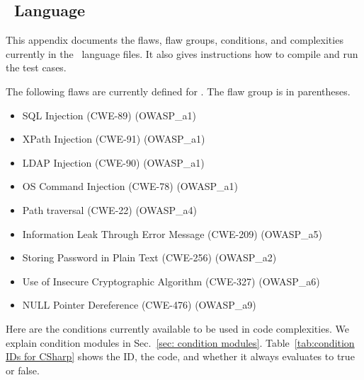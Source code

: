 \clearpage

\begin{appendices}

\section{\CSharp\ Language}
\label{sec:CSharp language}

This appendix documents the flaws, flaw groups, conditions, and complexities
currently in the
\CSharp\ language files.
It also gives instructions how to compile and run the test cases.

The following flaws are currently defined for \CSharp.
The flaw group is in parentheses.
\begin{itemize}[nosep]
    \item SQL Injection (CWE-89)
        (OWASP\_a1)
    \item XPath Injection (CWE-91)
        (OWASP\_a1)
    \item LDAP Injection (CWE-90)
        (OWASP\_a1)
    \item OS Command Injection (CWE-78)
        (OWASP\_a1)
    \item Path traversal (CWE-22)
        (OWASP\_a4)
    \item Information Leak Through Error Message (CWE-209)
        (OWASP\_a5)
    \item Storing Password in Plain Text (CWE-256)
        (OWASP\_a2)
    \item Use of Insecure Cryptographic Algorithm (CWE-327)
        (OWASP\_a6)
    \item NULL Pointer Dereference (CWE-476)
        (OWASP\_a9)
\end{itemize}

Here are the conditions currently available to be used in code complexities.
We explain condition modules in Sec.~\ref{sec: condition modules}.
Table~\ref{tab:condition IDs for CSharp} shows the ID, the code, and whether it
always evaluates to true or false.


\end{appendices}
